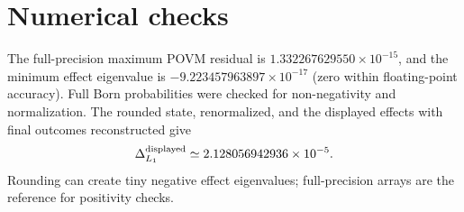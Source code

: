 \documentclass[11pt]{article}
\begin{document}
\section{Numerical checks}
The full-precision maximum POVM residual is $1.332267629550\times10^{-15}$,
and the minimum effect eigenvalue is $-9.223457963897\times10^{-17}$
(zero within floating-point accuracy). Full Born probabilities were checked
for non-negativity and normalization. The rounded state, renormalized, and
the displayed effects with final outcomes reconstructed give
\[
\Delta_{L_1}^{\rm displayed}\simeq 2.128056942936\times10^{-5}.
\]
Rounding can create tiny negative effect eigenvalues; full-precision
arrays are the reference for positivity checks.
\end{document}
